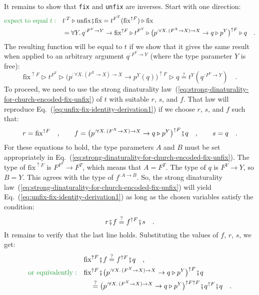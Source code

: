 It remains to show that \lstinline!fix! and \lstinline!unfix! are
inverses. Start with one direction:
\begin{align*}
{\color{greenunder}\text{expect to equal }t:}\quad & t^{:T}\triangleright\text{unfix}\bef\text{fix}=t^{F^{T}}(\text{fix}^{\uparrow F})\triangleright\text{fix}\\
 & =\forall Y.\,q^{:F^{Y}\rightarrow Y}\rightarrow\text{fix}^{\uparrow F}\triangleright t^{F^{T}}\triangleright\big(p^{:\forall X.\,(F^{X}\rightarrow X)\rightarrow X}\rightarrow q\triangleright p^{Y}\big)^{\uparrow F}\triangleright q\quad.
\end{align*}
The resulting function will be equal to $t$ if we show that it gives
the same result when applied to an arbitrary argument $q^{:F^{Y}\rightarrow Y}$
(where the type parameter $Y$ is free):
\begin{equation}
\text{fix}^{\uparrow F}\triangleright t^{F^{T}}\triangleright\big(p^{:\forall X.\,(F^{X}\rightarrow X)\rightarrow X}\rightarrow p^{Y}(q)\big)^{\uparrow F}\triangleright q\overset{?}{=}t^{Y}(q^{:F^{Y}\rightarrow Y})\quad.\label{eq:unfix-fix-identity-derivation1}
\end{equation}
To proceed, we need to use the strong dinaturality law~(\ref{eq:strong-dinaturality-for-church-encoded-fix-unfix})
of $t$ with suitable $r$, $s$, and $f$. That law will reproduce
Eq.~(\ref{eq:unfix-fix-identity-derivation1}) if we choose $r$,
$s$, and $f$ such that:
\[
r=\text{fix}^{\uparrow F}\quad,\quad\quad f=\big(p^{:\forall X.\,(F^{X}\rightarrow X)\rightarrow X}\rightarrow q\triangleright p^{Y}\big)^{\uparrow F}\bef q\quad,\quad\quad s=q\quad.
\]
For these equations to hold, the type parameters $A$ and $B$ must
be set appropriately in Eq.~(\ref{eq:strong-dinaturality-for-church-encoded-fix-unfix}).
The type of $\text{fix}^{\uparrow F}$ is $F^{F^{T}}\rightarrow F^{T}$,
which means that $A=F^{T}$. The type of $q$ is $F^{Y}\rightarrow Y$,
so $B=Y$. This agrees with the type of $f^{:A\rightarrow B}$. So,
the strong dinaturality law~(\ref{eq:strong-dinaturality-for-church-encoded-fix-unfix})
will yield Eq.~(\ref{eq:unfix-fix-identity-derivation1}) as long
as the chosen variables satisfy the condition:
\[
r\bef f\overset{?}{=}f^{\uparrow F}\bef s\quad.
\]
It remains to verify that the last line holds. Substituting the values
of $f$, $r$, $s$, we get:
\begin{align*}
 & \text{fix}^{\uparrow F}\bef f\overset{?}{=}f^{\uparrow F}\bef q\quad,\\
{\color{greenunder}\text{or equivalently}:}\quad & \text{fix}^{\uparrow F}\bef\big(p^{:\forall X.\,(F^{X}\rightarrow X)\rightarrow X}\rightarrow q\triangleright p^{Y}\big)^{\uparrow F}\bef q\\
 & \quad\overset{?}{=}\big(p^{:\forall X.\,(F^{X}\rightarrow X)\rightarrow X}\rightarrow q\triangleright p^{Y}\big)^{\uparrow F\uparrow F}\bef q^{\uparrow F}\bef q\quad.
\end{align*}
